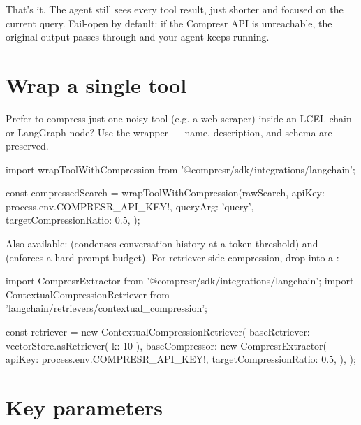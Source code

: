\documentclass[10pt]{article}
\begin{document}
\noindent That's it. The agent still sees every tool result, just shorter
and focused on the current query. Fail-open by default: if the Compresr
API is unreachable, the original output passes through and your agent
keeps running.

\section{Wrap a single tool}

Prefer to compress just one noisy tool (e.g. a web scraper) inside an LCEL
chain or LangGraph node? Use the wrapper — name, description, and schema
are preserved.

\begin{tscode}
import { wrapToolWithCompression } from '@compresr/sdk/integrations/langchain';

const compressedSearch = wrapToolWithCompression(rawSearch, {
  apiKey: process.env.COMPRESR_API_KEY!,
  queryArg: 'query',
  targetCompressionRatio: 0.5,
});
\end{tscode}

\noindent Also available: 
(condenses conversation history at a token threshold) and
 (enforces a hard prompt budget).
For retriever-side compression, drop 
into a :

\begin{tscode}
import { CompresrExtractor } from '@compresr/sdk/integrations/langchain';
import { ContextualCompressionRetriever } from 'langchain/retrievers/contextual_compression';

const retriever = new ContextualCompressionRetriever({
  baseRetriever: vectorStore.asRetriever({ k: 10 }),
  baseCompressor: new CompresrExtractor({
    apiKey: process.env.COMPRESR_API_KEY!,
    targetCompressionRatio: 0.5,
  }),
});
\end{tscode}

\section{Key parameters}
\end{document}
